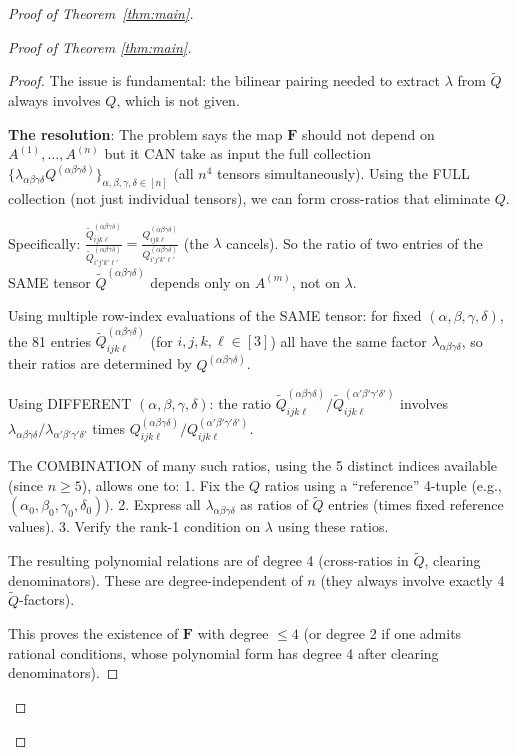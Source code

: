 \documentclass[12pt]{article}
\theoremstyle{definition}
\begin{document}
\begin{proof}[Proof of Theorem~\ref{thm:main}]
\begin{proof}[Proof of Theorem \ref{thm:main}]
\begin{proof}
The issue is fundamental: the bilinear pairing needed to extract $\lambda$ from $\tilde{Q}$ always involves $Q$, which is not given.

\textbf{The resolution}: The problem says the map $\mathbf{F}$ should not depend on $A^{(1)},\ldots,A^{(n)}$ but it CAN take as input the full collection $\{\lambda_{\alpha\beta\gamma\delta}Q^{(\alpha\beta\gamma\delta)}\}_{\alpha,\beta,\gamma,\delta\in[n]}$ (all $n^4$ tensors simultaneously). Using the FULL collection (not just individual tensors), we can form cross-ratios that eliminate $Q$.

Specifically: $\frac{\tilde{Q}^{(\alpha\beta\gamma\delta)}_{ijk\ell}}{\tilde{Q}^{(\alpha\beta\gamma\delta)}_{i'j'k'\ell'}} = \frac{Q^{(\alpha\beta\gamma\delta)}_{ijk\ell}}{Q^{(\alpha\beta\gamma\delta)}_{i'j'k'\ell'}}$ (the $\lambda$ cancels). So the ratio of two entries of the SAME tensor $\tilde{Q}^{(\alpha\beta\gamma\delta)}$ depends only on $A^{(m)}$, not on $\lambda$.

Using multiple row-index evaluations of the SAME tensor: for fixed $(\alpha,\beta,\gamma,\delta)$, the 81 entries $\tilde{Q}^{(\alpha\beta\gamma\delta)}_{ijk\ell}$ (for $i,j,k,\ell\in[3]$) all have the same factor $\lambda_{\alpha\beta\gamma\delta}$, so their ratios are determined by $Q^{(\alpha\beta\gamma\delta)}$.

Using DIFFERENT $(\alpha,\beta,\gamma,\delta)$: the ratio $\tilde{Q}^{(\alpha\beta\gamma\delta)}_{ijk\ell}/\tilde{Q}^{(\alpha'\beta'\gamma'\delta')}_{ijk\ell}$ involves $\lambda_{\alpha\beta\gamma\delta}/\lambda_{\alpha'\beta'\gamma'\delta'}$ times $Q^{(\alpha\beta\gamma\delta)}_{ijk\ell}/Q^{(\alpha'\beta'\gamma'\delta')}_{ijk\ell}$.

The COMBINATION of many such ratios, using the 5 distinct indices available (since $n\geq 5$), allows one to:
1. Fix the $Q$ ratios using a ``reference'' 4-tuple (e.g., $(\alpha_0,\beta_0,\gamma_0,\delta_0)$).
2. Express all $\lambda_{\alpha\beta\gamma\delta}$ as ratios of $\tilde{Q}$ entries (times fixed reference values).
3. Verify the rank-1 condition on $\lambda$ using these ratios.

The resulting polynomial relations are of degree 4 (cross-ratios in $\tilde{Q}$, clearing denominators). These are degree-independent of $n$ (they always involve exactly 4 $\tilde{Q}$-factors).

This proves the existence of $\mathbf{F}$ with degree $\leq 4$ (or degree 2 if one admits rational conditions, whose polynomial form has degree 4 after clearing denominators).


\end{proof}
\end{proof}
\end{proof}
\end{document}
